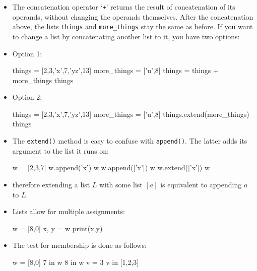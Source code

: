 \documentclass[a4paper]{article}
\begin{document}
\begin{itemize}
\item The concatenation operator `\Verb-+-' returns the result of concatenation
of its operands, without changing the operands themselves. After the
concatenation above, the lists \Verb+things+ and \Verb+more_things+ stay the
same as before. If you want to change a list by concatenating another list to
it, you have two options:

\item[] Option 1:
\begin{ucodeframe}
\begin{pyconsole}
things =  [2,3,'x',7,'yz',13]
more_things = ['u',8]
things = things + more_things
things
\end{pyconsole}
\end{ucodeframe}

\item[] Option 2:
\begin{ucodeframe}
\begin{pyconsole}
things =  [2,3,'x',7,'yz',13]
more_things = ['u',8]
things.extend(more_things)
things
\end{pyconsole}
\end{ucodeframe}


\item The \Verb+extend()+ method is easy to confuse with \Verb+append()+. The
latter adds its argument to the list it runs on:


\begin{ucodeframe}
\begin{pyconsole}
w =  [2,3,7]
w.append('x')
w
w.append(['x'])
w
w.extend(['x'])
w
\end{pyconsole}
\end{ucodeframe}

\item[] therefore extending a list $L$ with some list $[a]$ is
equivalent to appending $a$ to $L$. 

\item Lists allow for multiple assignments:

\begin{ucodeframe}
\begin{pyconsole}
w = [8,0]
x, y = w
print(x,y)
\end{pyconsole}
\end{ucodeframe}

\item The test for membership is done as follows:

\begin{ucodeframe}
\begin{pyconsole}
w = [8,0]
7 in w
8 in w
v = 3
v in [1,2,3]
\end{pyconsole}
\end{ucodeframe}


\end{itemize}
\end{document}

